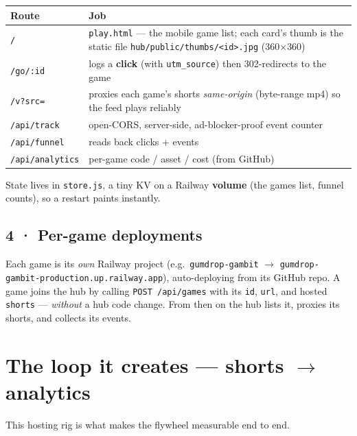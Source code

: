 \documentclass[11pt]{article}
\begin{document}
\begin{center}
\begin{tabular}{@{}lp{8.6cm}@{}}
\toprule
Route & Job \\
\midrule
\texttt{/} & \texttt{play.html} --- the mobile game list; each card's thumb is the static file \texttt{hub/public/thumbs/<id>.jpg} (360$\times$360) \\
\texttt{/go/:id} & logs a \textbf{click} (with \texttt{utm\_source}) then 302-redirects to the game \\
\texttt{/v?src=} & proxies each game's shorts \emph{same-origin} (byte-range mp4) so the feed plays reliably \\
\texttt{/api/track} & open-CORS, server-side, ad-blocker-proof event counter \\
\texttt{/api/funnel} & reads back clicks + events \\
\texttt{/api/analytics} & per-game code / asset / cost (from GitHub) \\
\bottomrule
\end{tabular}
\end{center}

\noindent State lives in \texttt{store.js}, a tiny KV on a Railway \textbf{volume} (the
games list, funnel counts), so a restart paints instantly.

\subsection{4 · Per-game deployments}
Each game is its \emph{own} Railway project (e.g.\ \texttt{gumdrop-gambit} $\to$
\texttt{gumdrop-gambit-\allowbreak production\allowbreak.up.railway.app}), auto-deploying from its GitHub repo.
A game joins the hub by calling \texttt{POST /api/games} with its \texttt{id},
\texttt{url}, and hosted \texttt{shorts} --- \emph{without} a hub code change. From then
on the hub lists it, proxies its shorts, and collects its events.

\section{The loop it creates --- shorts $\to$ analytics}
This hosting rig is what makes the flywheel measurable end to end.
\end{document}
